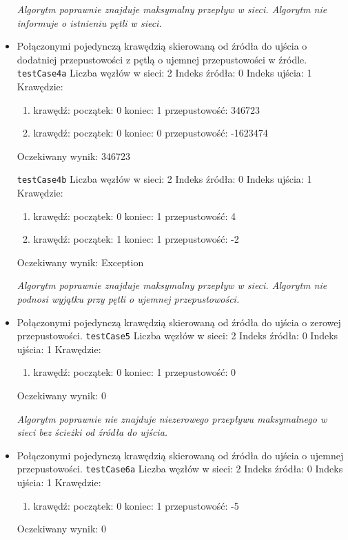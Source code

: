 \begin{itemize}[nosep]
    \emph{Algorytm poprawnie znajduje maksymalny przepływ
w sieci. Algorytm nie informuje o istnieniu pętli w sieci.}

    \item Połączonymi pojedynczą krawędzią skierowaną od źródła do ujścia o dodatniej przepustowości z pętlą o ujemnej przepustowości w źródle.
    \texttt{testCase4a}
    Liczba węzłów w sieci: 2
    Indeks źródła: 0
    Indeks ujścia: 1
    Krawędzie:
    \begin{enumerate}[nosep]
        \item krawędź:
        początek: 0
        koniec: 1
        przepustowość: 346723
        \item krawędź:
        początek: 0
        koniec: 0
        przepustowość: -1623474
    \end{enumerate}
    Oczekiwany wynik: 346723

    \texttt{testCase4b}
    Liczba węzłów w sieci: 2
    Indeks źródła: 0
    Indeks ujścia: 1
    Krawędzie:
    \begin{enumerate}[nosep]
        \item krawędź:
        początek: 0
        koniec: 1
        przepustowość: 4
        \item krawędź:
        początek: 1
        koniec: 1
        przepustowość: -2
    \end{enumerate}
    Oczekiwany wynik: Exception

    \emph{Algorytm poprawnie znajduje maksymalny przepływ
    w sieci. Algorytm nie podnosi wyjątku przy pętli o ujemnej przepustowości.}

    \item Połączonymi pojedynczą krawędzią skierowaną od źródła do ujścia o zerowej przepustowości.
    \texttt{testCase5}
    Liczba węzłów w sieci: 2
    Indeks źródła: 0
    Indeks ujścia: 1
    Krawędzie:
    \begin{enumerate}[nosep]
        \item krawędź:
        początek: 0
        koniec: 1
        przepustowość: 0
    \end{enumerate}
    Oczekiwany wynik: 0

    \emph{Algorytm poprawnie nie znajduje niezerowego przepływu
    maksymalnego w sieci bez ścieżki od źródła do ujścia.}

    \item Połączonymi pojedynczą krawędzią skierowaną od źródła do ujścia o ujemnej przepustowości.
    \texttt{testCase6a}
    Liczba węzłów w sieci: 2
    Indeks źródła: 0
    Indeks ujścia: 1
    Krawędzie:
    \begin{enumerate}[nosep]
        \item krawędź:
        początek: 0
        koniec: 1
        przepustowość: -5
    \end{enumerate}
    Oczekiwany wynik: 0


\end{itemize}
